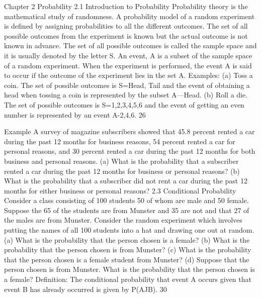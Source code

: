 Chapter 2 Probability 2.1 Introduction to Probability 
Probability theory is the mathematical study of randomness. A probability model of a random experiment is defined by assigning probabilities to all the different outcomes. The set of all possible outcomes from the experiment is known but the actual outcome is not known in advance. The set of all possible outcomes is called the sample space and it is usually denoted by the letter S. 
An event, A is a subset of the sample space of a random experiment. When the experiment is performed, the event A is said to occur if the outcome of the experiment lies in the set A. Examples: (a) Toss a coin. The set of possible outcomes is S=Head, Tail and the event of obtaining a head when tossing a coin is represented by the subset A—Head. (b) Roll a die. The set of possible outcomes is S=1,2,3,4,5,6 and the event of getting an even number is represented by an event A-2,4,6. 
26 




Example A survey of magazine subscribers showed that 45.8 percent rented a car during the past 12 months for business reasons, 54 percent rented a car for personal reasons, and 30 percent rented a car during the past 12 months for both business and personal reasons. (a) What is the probability that a subscriber rented a car during the past 12 months for business or personal reasons? (b) What is the probability that a subscriber did not rent a car during the past 12 months for either business or personal reasons? 
2.3 Conditional Probability 
Consider a class consisting of 100 students 50 of whom are male and 50 female. Suppose the 65 of the students are from Munster and 35 are not and that 27 of the males are from Munster. Consider the random experiment which involves putting the names of all 100 students into a hat and drawing one out at random. (a) What is the probability that the person chosen is a female? (b) What is the probability that the person chosen is from Munster? (c) What is the probability that the person chosen is a female student from Munster? (d) Suppose that the person chosen is from Munster. What is the probability that the person chosen is a female? 
Definition: The conditional probability that event A occurs given that event B has already 
occurred is given by P(AJB). 
30 







